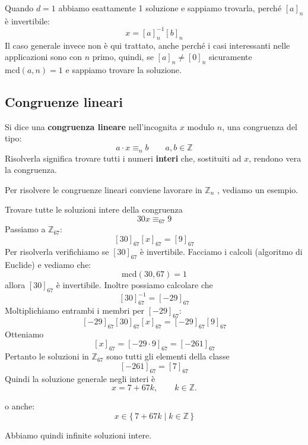 \documentclass[
  a4paper,
]{article}
\begin{document}
\begin{observationbox}
Quando \(d = 1\) abbiamo esattamente 1 soluzione e sappiamo trovarla,
perché \([a]_n\) è invertibile: \[
x =  [a]_n^{-1} [b]_n
\] Il caso generale invece non è qui trattato, anche perché i casi
interessanti nelle applicazioni sono con \(n\) primo, quindi, se
\([a]_n \neq [0]_n\) sicuramente \(\text{mcd}(a, n) = 1\) e sappiamo
trovare la soluzione.
\end{observationbox}

\hypertarget{congruenze-lineari}{%
\subsection{Congruenze lineari}\label{congruenze-lineari}}

\begin{definitionbox}
Si dice una \textbf{congruenza lineare} nell'incognita \(x\) modulo
\(n\), una congruenza del tipo: \[
a\cdot x \equiv_n b \qquad a, b \in \mathbb Z
\] Risolverla significa trovare tutti i numeri \textbf{interi} che,
sostituiti ad \(x\), rendono vera la congruenza.
\end{definitionbox}

Per risolvere le congruenze lineari conviene lavorare in
\(\mathbb Z _n\) , vediamo un esempio.

\begin{examplebox}
Trovare tutte le soluzioni intere della congruenza \[
30x \equiv_{67} 9
\] Passiamo a \(\mathbb{Z}_{67}\): \[
[30]_{67}[x]_{67} = [9]_{67}
\] Per risolverla verifichiamo se \([30]_{67}\) è invertibile. Facciamo
i calcoli (algoritmo di Euclide) e vediamo che: \[
\text{mcd}(30,67)=1
\] allora \([30]_{67}\) è invertibile. Inoltre possiamo calcolare che \[
[30]_{67}^{-1}=[-29]_{67}
\] Moltiplichiamo entrambi i membri per \([-29]_{67}\): \[
[-29]_{67}[30]_{67}[x]_{67}
=
[-29]_{67}[9]_{67}
\] Otteniamo \[
[x]_{67}
=
[-29\cdot 9]_{67}
=
[-261]_{67}
\] Pertanto le soluzioni in \(\mathbb{Z}_{67}\) sono tutti gli elementi
della classe \[
[-261]_{67}=[7]_{67}
\] Quindi la soluzione generale negli interi è \[
x = 7 + 67k,
\qquad k\in\mathbb{Z}.
\]

o anche: \[
x \in \{\, 7 + 67k \mid k\in\mathbb{Z} \,\}
\]

Abbiamo quindi infinite soluzioni intere.
\end{examplebox}
\end{document}
